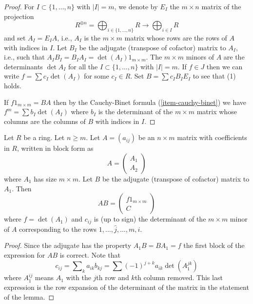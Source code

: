 \begin{proof}
For $I \subset \{1, \ldots, n\}$ with $|I| = m$, we denote
by $E_I$ the $m \times n$ matrix of the projection
$$
R^{\oplus n} = \bigoplus\nolimits_{i \in \{1, \ldots, n\}} R
\longrightarrow \bigoplus\nolimits_{i \in I} R
$$
and set $A_I = E_I A$, i.e., $A_I$ is the $m \times m$ matrix
whose rows are the rows of $A$ with indices in $I$.
Let $B_I$ be the adjugate (transpose of
cofactor) matrix to $A_I$, i.e., such that
$A_I B_I = B_I A_I = \det(A_I) 1_{m \times m}$.
The $m \times m$ minors of $A$ are the determinants $\det A_I$
for all the $I \subset \{1, \ldots, n\}$ with $|I| = m$.
If $f \in J$ then we can write $f = \sum c_I \det(A_I)$ for some
$c_I \in R$. Set $B = \sum c_I B_I E_I$ to see that (1) holds.

\medskip\noindent
If $f 1_{m \times m} = BA$ then by the
Cauchy-Binet formula (\ref{item-cauchy-binet}) we
have $f^m = \sum b_I \det(A_I)$ where $b_I$ is the determinant
of the $m \times m$ matrix whose columns are the columns of $B$ with
indices in $I$.
\end{proof}

\begin{lemma}
\label{lemma-matrix-right-inverse}
Let $R$ be a ring. Let $n \geq m$. Let $A = (a_{ij})$ be an
$n \times m$ matrix with coefficients in $R$, written in block form
as
$$
A =
\left(
\begin{matrix}
A_1 \\
A_2
\end{matrix}
\right)
$$
where $A_1$ has size $m \times m$. Let $B$ be the adjugate (transpose of
cofactor) matrix to $A_1$. Then
$$
AB = 
\left(
\begin{matrix}
f 1_{m \times m} \\
C
\end{matrix}
\right)
$$
where $f = \det(A_1)$ and $c_{ij}$ is (up to sign) the determinant of the
$m \times m$ minor of $A$ corresponding to the rows
$1, \ldots, \hat j, \ldots, m, i$.
\end{lemma}

\begin{proof}
Since the adjugate has the property $A_1B = B A_1 = f$ the first block
of the expression for $AB$ is correct. Note that
$$
c_{ij} = \sum\nolimits_k a_{ik}b_{kj} = \sum (-1)^{j + k}a_{ik} \det(A_1^{jk})
$$
where $A_1^{ij}$ means $A_1$ with the $j$th row and $k$th column removed.
This last expression is the row expansion of the determinant of the matrix
in the statement of the lemma.
\end{proof}

